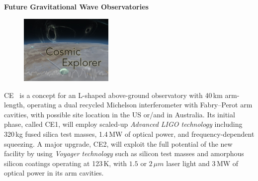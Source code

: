 \begin{DetBox}{\bf Future Gravitational Wave Observatories}
\begin{tcolorbox}[standard jigsaw,colframe=antiquefuchsia!80!black,colback=antiquefuchsia!20!white,opacityback=0.6,coltext=black,size=small, title=Cosmic Explorer (CE)] 
\begin{figure}
\vspace{-10pt}
\includegraphics*[width=0.4\textwidth]{Figures/CE_Thumb.jpg}
\label{fig:CE_Thumb}
\vspace{-20pt}
\end{figure}
CE~\cite{CosmicExplorer2017} is a concept for an L-shaped above-ground observatory with 40\,km arm-length, operating a dual recycled Michelson interferometer with Fabry--Perot arm cavities, with possible site location in the US or/and in Australia. 
Its initial phase, called CE1, will employ scaled-up \emph{Advanced LIGO technology} including 320\,kg fused silica test masses, 1.4\,MW of optical power, and frequency-dependent squeezing. 
A major upgrade, CE2, will exploit the full potential of the new facility by using \emph{Voyager technology} such as silicon test masses and amorphous silicon coatings operating at 123\,K, with $1.5$ or $2\,\mu m$ laser light and 3\,MW of optical power in its arm cavities.

\end{tcolorbox}

\begin{tcolorbox}[standard jigsaw,colframe=azure!70!black,colback=azure!20!white,opacityback=0.6,coltext=black, size=small, title=Voyager]


\end{tcolorbox}
\end{DetBox}
